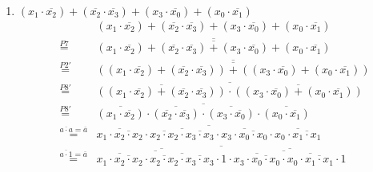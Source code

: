 \documentclass[a4paper]{article}
\begin{document}
\begin{enumerate}[label=\alph*)]
	\item $(x_1 \cdot \overline{x_2}) + (\overline{x_2} \cdot \overline{x_3}) + (x_3 \cdot \overline{x_0}) + (x_0 \cdot \overline{x_1})$
	\begin{equation}
	\begin{aligned}
		&&(x_1 \cdot \overline{x_2}) + (\overline{x_2} \cdot \overline{x_3}) + (x_3 \cdot \overline{x_0}) + (x_0 \cdot \overline{x_1}) \\
		&\stackrel{P7}{=} &\overline{\overline{(x_1 \cdot \overline{x_2}) + (\overline{x_2} \cdot \overline{x_3}) + (x_3 \cdot \overline{x_0}) + (x_0 \cdot \overline{x_1})}} \\
		&\stackrel{P2'}{=} &\overline{\overline{((x_1 \cdot \overline{x_2}) + (\overline{x_2} \cdot \overline{x_3})) + ((x_3 \cdot \overline{x_0}) + (x_0 \cdot \overline{x_1}))}} \\
		&\stackrel{P8'}{=} &\overline{\overline{((x_1 \cdot \overline{x_2}) + (\overline{x_2} \cdot \overline{x_3}))} \cdot \overline{((x_3 \cdot \overline{x_0}) + (x_0 \cdot \overline{x_1}))}} \\
		&\stackrel{P8'}{=} &\overline{\overline{(x_1 \cdot \overline{x_2})} \cdot \overline{(\overline{x_2} \cdot \overline{x_3})} \cdot \overline{(x_3 \cdot \overline{x_0})} \cdot \overline{(x_0 \cdot \overline{x_1})}} \\
		&\stackrel{\overline{a \cdot a} = \overline{a}}{=} &\overline{\overline{x_1 \cdot \overline{x_2 \cdot x_2}} \cdot \overline{\overline{x_2 \cdot x_2} \cdot \overline{x_3 \cdot x_3}} \cdot \overline{x_3 \cdot \overline{x_0 \cdot x_0}} \cdot \overline{x_0 \cdot \overline{x_1 \cdot x_1}}} \\
		&\stackrel{\overline{a \cdot 1} = \overline{a}}{=} &\overline{\overline{\overline{\overline{x_1 \cdot \overline{x_2 \cdot x_2}} \cdot \overline{\overline{x_2 \cdot x_2} \cdot \overline{x_3 \cdot x_3}}} \cdot 1} \cdot \overline{\overline{\overline{x_3 \cdot \overline{x_0 \cdot x_0}} \cdot \overline{x_0 \cdot \overline{x_1 \cdot x_1}}} \cdot 1}}
	\end{aligned}
	\end{equation}
	
\end{enumerate}
\end{document}
